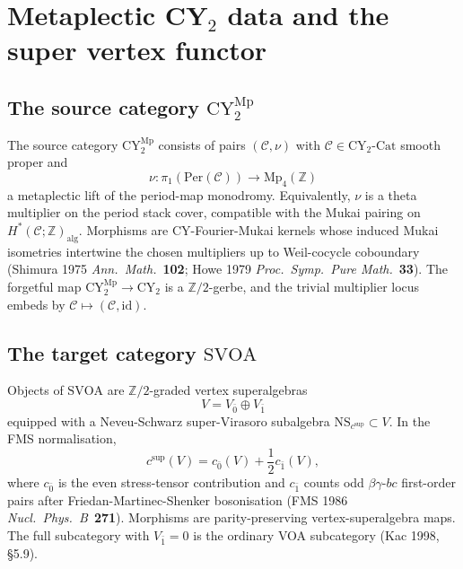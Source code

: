\providecommand{\Sp}{\mathrm{Sp}}
\providecommand{\Mp}{\mathrm{Mp}}
\providecommand{\Z}{\mathbb{Z}}
\providecommand{\Q}{\mathbb{Q}}
\providecommand{\C}{\mathbb{C}}
\providecommand{\R}{\mathbb{R}}
\providecommand{\CY}{\mathrm{CY}}
\providecommand{\SVOA}{\mathrm{SVOA}}
\providecommand{\VOA}{\mathrm{VOA}}
\providecommand{\NS}{\mathrm{NS}}
\providecommand{\ChirAlg}{\mathrm{ChirAlg}}
\providecommand{\Cat}{\mathrm{Cat}}
\providecommand{\cC}{\mathcal{C}}
\providecommand{\Coh}{\mathrm{Coh}}
\providecommand{\cO}{\mathcal{O}}
\providecommand{\Aut}{\mathrm{Aut}}
\providecommand{\id}{\mathrm{id}}
\providecommand{\kBKM}{\kappa_{\mathrm{BKM}}}
\providecommand{\fg}{\mathfrak{g}}
\providecommand{\fsg}{\mathfrak{sg}}
\providecommand{\osp}{\mathfrak{osp}}
\providecommand{\Phisup}{\Phi^{\mathrm{sup}}}

\section{Metaplectic CY\(_2\) data and the super vertex functor}
\label{sec:phi-sup-functor}

\subsection*{The source category \(\CY_2^{\Mp}\)}

The source category \(\CY_2^{\Mp}\) consists of pairs
\((\cC,\nu)\) with \(\cC\in\CY_2\text{-}\Cat\) smooth proper and
\[
  \nu:\pi_1(\mathrm{Per}(\cC))\longrightarrow \Mp_4(\Z)
\]
a metaplectic lift of the period-map monodromy. Equivalently, \(\nu\)
is a theta multiplier on the period stack cover, compatible with the
Mukai pairing on \(H^*(\cC;\Z)_{\mathrm{alg}}\). Morphisms are
CY-Fourier-Mukai kernels whose induced Mukai isometries intertwine the
chosen multipliers up to Weil-cocycle coboundary (Shimura 1975
\emph{Ann.\ Math.}\ \textbf{102}; Howe 1979
\emph{Proc.\ Symp.\ Pure Math.}\ \textbf{33}). The forgetful map
\(\CY_2^{\Mp}\to\CY_2\) is a \(\Z/2\)-gerbe, and the trivial
multiplier locus embeds by \(\cC\mapsto(\cC,\id)\).

\subsection*{The target category \(\SVOA\)}

Objects of \(\SVOA\) are \(\Z/2\)-graded vertex superalgebras
\[
  V=V_{\bar 0}\oplus V_{\bar 1}
\]
equipped with a Neveu-Schwarz super-Virasoro subalgebra
\(\NS_{c^{\mathrm{sup}}}\subset V\). In the FMS normalisation,
\[
  c^{\mathrm{sup}}(V)
  =
  c_{\bar 0}(V)+\frac12 c_{\bar 1}(V),
\]
where \(c_{\bar 0}\) is the even stress-tensor contribution and
\(c_{\bar 1}\) counts odd \(\beta\gamma\)-\(bc\) first-order pairs
after Friedan-Martinec-Shenker bosonisation (FMS 1986
\emph{Nucl.\ Phys.\ B}~\textbf{271}). Morphisms are parity-preserving
vertex-superalgebra maps. The full subcategory with \(V_{\bar 1}=0\)
is the ordinary VOA subcategory (Kac 1998, \S5.9).

